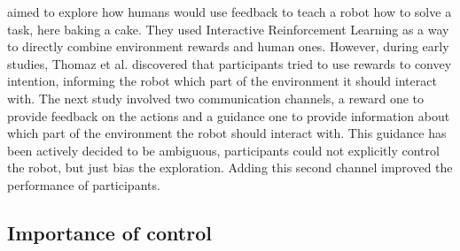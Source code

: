 \cite{thomaz2008teachable} aimed to explore how humans would use feedback to teach a robot how to solve a task,  here baking a cake. They used Interactive Reinforcement Learning as a way to directly combine environment rewards and human ones. However, during early studies, Thomaz et al. discovered that participants tried to use rewards to convey intention, informing the robot which part of the environment it should interact with. The next study involved two communication channels, a reward one to provide feedback on the actions and a guidance one to provide information about which part of the environment the robot should interact with. This guidance has been actively decided to be ambiguous, participants could not explicitly control the robot, but just bias the exploration. Adding this second channel improved the performance of participants.





\subsection{Importance of control}

